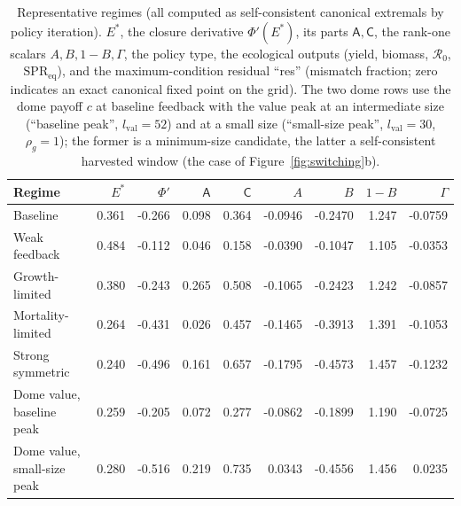 \documentclass[pdflatex,sn-mathphys-num]{sn-jnl}
\theoremstyle{plain}
\theoremstyle{definition}
\theoremstyle{remark}
\begin{document}
\begin{table}[t]
\centering
\footnotesize
\setlength{\tabcolsep}{4.0pt}
\caption{Representative regimes (all computed as self-consistent canonical
extremals by policy iteration). $E^*$, the closure derivative $\Phi'(E^*)$, its
parts $\mathsf A,\mathsf C$, the rank-one scalars $A,B,1-B,\Gamma$, the policy
type, the ecological outputs (yield, biomass, $\mathcal R_0$,
$\mathrm{SPR}_{\mathrm{eq}}$), and the maximum-condition residual ``res''
(mismatch fraction; zero indicates an exact canonical fixed point on the grid).
The two dome rows use the dome payoff $c$ at baseline feedback with the value peak
at an intermediate size (``baseline peak'', $l_{\mathrm{val}}=52$) and at a small
size (``small-size peak'', $l_{\mathrm{val}}=30$, $\rho_g=1$); the former is a
minimum-size candidate, the latter a self-consistent harvested window
(the case of Figure~\ref{fig:switching}b).}
\label{tab:regimes}

\begin{tabular}{lrrrrrrrr}
\toprule
Regime & $E^*$ & $\Phi'$ & $\mathsf A$ & $\mathsf  C$ & $A$ & $B$ & $1{-}B$ & $\Gamma$ \\
\midrule
Baseline & 0.361 & -0.266 & 0.098 & 0.364 & -0.0946 & -0.2470 & 1.247 & -0.0759 \\
Weak feedback & 0.484 & -0.112 & 0.046 & 0.158 & -0.0390 & -0.1047 & 1.105 & -0.0353 \\
Growth-limited & 0.380 & -0.243 & 0.265 & 0.508 & -0.1065 & -0.2423 & 1.242 & -0.0857 \\
Mortality-limited & 0.264 & -0.431 & 0.026 & 0.457 & -0.1465 & -0.3913 & 1.391 & -0.1053 \\
Strong symmetric & 0.240 & -0.496 & 0.161 & 0.657 & -0.1795 & -0.4573 & 1.457 & -0.1232 \\
Dome value, baseline peak & 0.259 & -0.205 & 0.072 & 0.277 & -0.0862 & -0.1899 & 1.190 & -0.0725 \\
Dome value, small-size peak & 0.280 & -0.516 & 0.219 & 0.735 & 0.0343 & -0.4556 & 1.456 & 0.0235 \\
\bottomrule
\end{tabular}

\vspace{1.5em}


\end{table}
\end{document}
